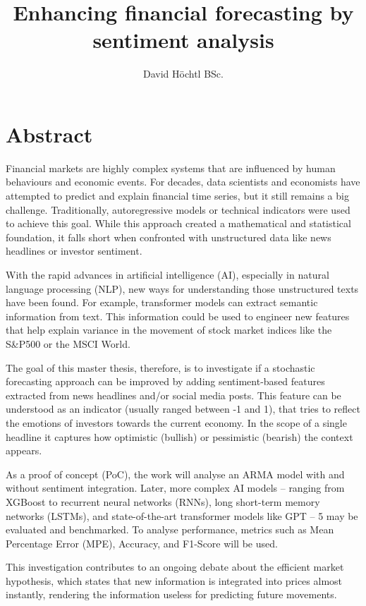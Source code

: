 \documentclass[MAI,Projekt,english,IEEE]{twbook}%
\title{Enhancing financial forecasting by sentiment analysis}
\author{David Höchtl BSc.}
\begin{document}
\maketitle
\chapter{Abstract}
Financial markets are highly complex systems that are influenced by human behaviours and economic events. For decades, data scientists and economists have attempted to predict and explain financial time series, but it still remains a big challenge. Traditionally, autoregressive models or technical indicators were used to achieve this goal. While this approach created a mathematical and statistical foundation, it falls short when confronted with unstructured data like news headlines or investor sentiment.

With the rapid advances in artificial intelligence (AI), especially in natural language processing (NLP), new ways for understanding those unstructured texts have been found. For example, transformer models can extract semantic information from text. This information could be used to engineer new features that help explain variance in the movement of stock market indices like the S\&P500 or the MSCI World. 

The goal of this master thesis, therefore, is to investigate if a stochastic forecasting approach can be improved by adding sentiment-based features extracted from news headlines and/or social media posts. This feature can be understood as an indicator (usually ranged between -1 and 1), that tries to reflect the emotions of investors towards the current economy. In the scope of a single headline it captures how optimistic (bullish) or pessimistic (bearish) the context appears.

As a proof of concept (PoC), the work will analyse an ARMA model with and without sentiment integration. Later, more complex AI models – ranging from XGBoost to recurrent neural networks (RNNs), long short-term memory networks (LSTMs), and state-of-the-art transformer models like GPT – 5 may be evaluated and benchmarked. To analyse performance, metrics such as Mean Percentage Error (MPE), Accuracy, and F1-Score will be used.

This investigation contributes to an ongoing debate about the efficient market hypothesis, which states that new information is integrated into prices almost instantly, rendering the information useless for predicting future movements.
\end{document}
